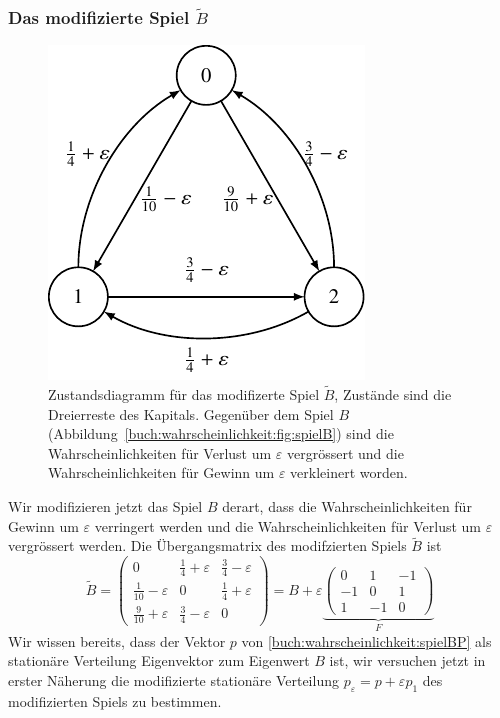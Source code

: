 \subsubsection{Das modifizierte Spiel $\tilde{B}$}
\begin{figure}
\centering
\includegraphics{chapters/80-wahrscheinlichkeit/images/spielBtilde.pdf}
\caption{Zustandsdiagramm für das modifizerte Spiel $\tilde{B}$,
Zustände sind die Dreierreste des Kapitals.
Gegenüber dem Spiel $B$
(Abbildung~\ref{buch:wahrscheinlichkeit:fig:spielB})
sind die Wahrscheinlichkeiten für Verlust 
um $\varepsilon$ vergrössert und die Wahrscheinlichkeiten für Gewinn um
$\varepsilon$ verkleinert worden.
\label{buch:wahrscheinlichkeit:fig:spielBtile}}
\end{figure}
%
Wir modifizieren jetzt das Spiel $B$ derart, dass die Wahrscheinlichkeiten
für Gewinn um $\varepsilon$ verringert werden und die Wahrscheinlichkeiten
für Verlust um $\varepsilon$ vergrössert werden.
Die Übergangsmatrix des modifzierten Spiels $\tilde{B}$ ist
\[
\tilde{B}
=
\begin{pmatrix}
 0                       & \frac{1}{4}+\varepsilon & \frac{3}{4}-\varepsilon \\
\frac{1}{10}-\varepsilon & 0                       & \frac{1}{4}+\varepsilon \\
\frac{9}{10}+\varepsilon & \frac{3}{4}-\varepsilon & 0
\end{pmatrix}
=
B
+
\varepsilon
\underbrace{
\begin{pmatrix}
 0& 1&-1\\
-1& 0& 1\\
 1&-1& 0
\end{pmatrix}
}_{\displaystyle F}
\]
Wir wissen bereits, dass der Vektor $p$
von \eqref{buch:wahrscheinlichkeit:spielBP}
als stationäre Verteilung
Eigenvektor zum Eigenwert
$B$ ist, wir versuchen jetzt in erster Näherung die modifizierte
stationäre Verteilung $p_{\varepsilon}=p+\varepsilon p_1$ des modifizierten
Spiels zu bestimmen.

